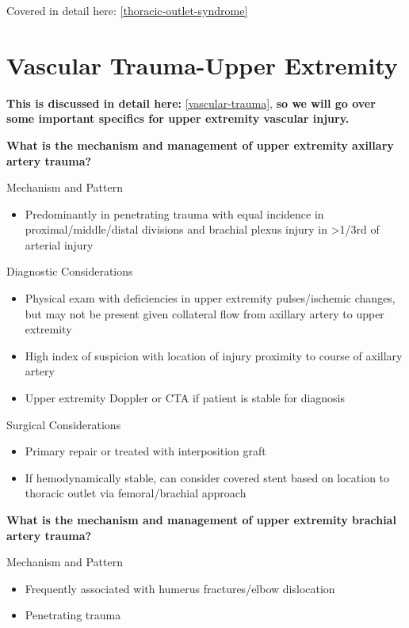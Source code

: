 \documentclass[
]{book}
\providecommand{\tightlist}{%
  \setlength{\itemsep}{0pt}\setlength{\parskip}{0pt}}
\begin{document}
Covered in detail here: \ref{thoracic-outlet-syndrome}

\hypertarget{vascular-trauma-upper-extremity}{%
\section{Vascular Trauma-Upper Extremity}\label{vascular-trauma-upper-extremity}}

\textbf{This is discussed in detail here:} \ref{vascular-trauma}, \textbf{so we
will go over some important specifics for upper extremity vascular
injury.} \citet{kauvar184VascularTrauma2020}

\textbf{What is the mechanism and management of upper extremity axillary
artery trauma?}

Mechanism and Pattern

\begin{itemize}
\tightlist
\item
  Predominantly in penetrating trauma with equal incidence in
  proximal/middle/distal divisions and brachial plexus injury
  in \textgreater1/3rd of arterial injury
\end{itemize}

Diagnostic Considerations

\begin{itemize}
\item
  Physical exam with deficiencies in upper extremity pulses/ischemic
  changes, but may not be present given collateral flow from axillary
  artery to upper extremity~
\item
  High index of suspicion with location of injury proximity to course
  of axillary artery
\item
  Upper extremity Doppler or CTA if patient is stable for diagnosis
\end{itemize}

Surgical Considerations~

\begin{itemize}
\item
  Primary repair or treated with interposition graft~
\item
  If hemodynamically stable, can consider covered stent based on
  location to thoracic outlet via femoral/brachial approach
\end{itemize}

\textbf{What is the mechanism and management of upper extremity brachial
artery trauma?}

Mechanism and Pattern

\begin{itemize}
\item
  Frequently associated with humerus fractures/elbow dislocation
\item
  Penetrating trauma
\end{itemize}
\end{document}

